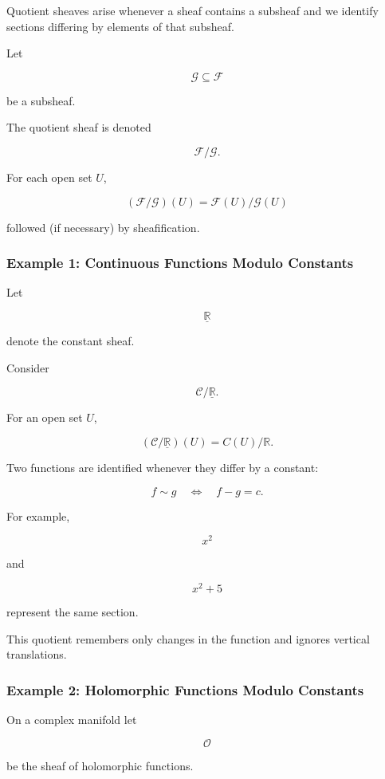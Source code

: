 \documentclass[12pt,a4paper]{article}
\theoremstyle{notespace}
\begin{document}
Quotient sheaves arise whenever a sheaf contains a subsheaf and we identify sections differing by elements of that subsheaf.

\bigskip

Let

\[
\mathcal G\subseteq \mathcal F
\]

be a subsheaf.

The quotient sheaf is denoted

\[
\mathcal F/\mathcal G.
\]

For each open set \(U\),

\[
(\mathcal F/\mathcal G)(U)
=
\mathcal F(U)/\mathcal G(U)
\]

followed (if necessary) by sheafification.

\subsubsection*{Example 1: Continuous Functions Modulo Constants}

Let

\[
\underline{\mathbb R}
\]

denote the constant sheaf.

Consider

\[
\mathcal C/\underline{\mathbb R}.
\]

For an open set \(U\),

\[
(\mathcal C/\underline{\mathbb R})(U)
=
C(U)/\mathbb R.
\]

Two functions are identified whenever they differ by a constant:

\[
f\sim g
\quad\Longleftrightarrow\quad
f-g=c.
\]

For example,

\[
x^2
\]

and

\[
x^2+5
\]

represent the same section.

This quotient remembers only changes in the function and ignores vertical translations.

\bigskip

\subsubsection*{Example 2: Holomorphic Functions Modulo Constants}

On a complex manifold let

\[
\mathcal O
\]

be the sheaf of holomorphic functions.
\end{document}
